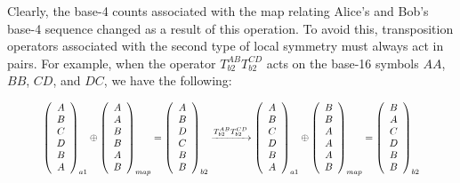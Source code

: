 \documentclass{article}
\begin{document}
Clearly, the base-4 counts associated with the map relating Alice's and Bob's base-4 sequence changed as a result of this operation. To avoid this, transposition operators associated with the second type of local symmetry must always act in pairs. For example, when the operator $T^{AB}_{b2}T^{CD}_{b2}$ acts on the base-16 symbols $AA$, $BB$, $CD$, and $DC$, we have the following:

\begin{equation}
\scalebox{0.8}{$\begin{aligned}
\left(\begin{array}{c}
A\\
B\\
C\\
D\\
B\\
A
\end{array}\right)_{a1}\oplus\left(\begin{array}{c}
A\\
A\\
B\\
B\\
A\\
B
\end{array}\right)_{map}=\left(\begin{array}{c}
A\\
B\\
D\\
C\\
B\\
B
\end{array}\right)_{b2}\xrightarrow[]{T^{AB}_{b2}T^{CD}_{b2}}
\left(\begin{array}{c}
A\\
B\\
C\\
D\\
B\\
A
\end{array}\right)_{a1}\oplus\left(\begin{array}{c}
B\\
B\\
A\\
A\\
A\\
B
\end{array}\right)_{map}=\left(\begin{array}{c}
B\\
A\\
C\\
D\\
B\\
B
\end{array}\right)_{b2}
\end{aligned}$}
\label{eq: transposition 3}
\end{equation}
\end{document}
